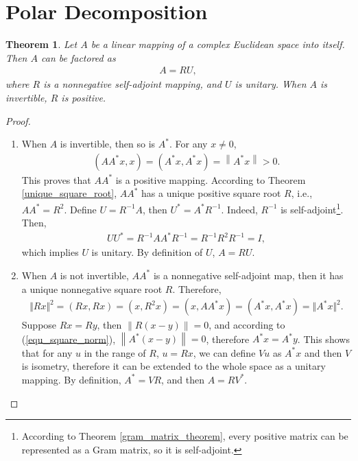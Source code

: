 \documentclass[11pt]{book}
\newtheorem{theorem}{Theorem}[chapter]
\theoremstyle{definition}
\numberwithin{equation}{chapter}
\begin{document}
\section{Polar Decomposition}
\begin{theorem}\label{polar_decomposition_theorem}
Let $A$ be a linear mapping of a complex Euclidean space into itself. Then $A$ can be factored as 
\begin{align}\label{polar_decomposition}
    A = RU,
\end{align}
where $R$ is a nonnegative self-adjoint mapping, and $U$ is unitary. When $A$ is invertible, $R$ is positive.
\end{theorem}
\begin{proof}
~\begin{enumerate}[label=(\alph*)]
    \item When $A$ is invertible, then so is $A^*$. For any $x \neq 0$,
    \begin{align*}
        (A A^* x, x) = (A^* x, A^* x) = \left\|A^* x\right\| > 0.
    \end{align*}
    This proves that $A A^*$ is a positive mapping. According to Theorem \ref{unique_square_root}, $A A^*$ has a unique positive square root $R$, i.e., $A A^* = R^2$. Define $U = R^{-1}A$, then $U^* = A^* R^{-1}$. Indeed, $R^{-1}$ is self-adjoint\footnote{According to Theorem \ref{gram_matrix_theorem}, every positive matrix can be represented as a Gram matrix, so it is self-adjoint.}. Then,
    \begin{align*}
        U U^* = R^{-1}A A^* R^{-1} = R^{-1} R^2 R^{-1} = I,
    \end{align*}
    which implies $U$ is unitary. By definition of $U$, $A = RU$.
    
    \item When $A$ is not invertible, $AA^*$ is a nonnegative self-adjoint map, then it has a unique nonnegative square root $R$. Therefore, 
    \begin{align}\label{equ_square_norm}
        \Vert R x \Vert^2 = (Rx, Rx) = (x, R^2 x) = (x, AA^*x) = (A^*x, A^*x) = \Vert A^*x \Vert^2.
    \end{align}
    Suppose $Rx = Ry$, then $\left\|R (x - y)\right\| = 0$, and according to (\ref{equ_square_norm}), $\left\|A^* (x - y)\right\| = 0$, therefore $A^* x = A^* y$. This shows that for any $u$ in the range of $R$, $u = Rx$, we can define $Vu$ as 
    $A^* x$ and then $V$ is isometry, therefore it can be extended to the whole space as a unitary mapping. By definition, $A^* = VR$, and then $A = RV^*$.
\end{enumerate}
\end{proof}
\end{document}
